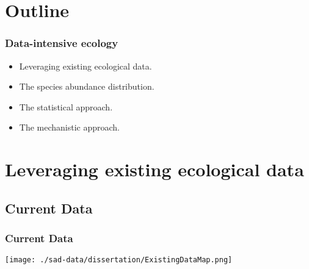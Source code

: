 \documentclass[14pt]{beamer}
\begin{document}
\section{Outline}
\begin{frame}
\frametitle{Data-intensive ecology}
\begin{itemize}
\item Leveraging existing ecological data.
\item The species abundance distribution.
\item The statistical approach.
\item The mechanistic approach.
\end{itemize}
\end{frame}


\section{Leveraging existing ecological data}
\subsection{Current Data}
\begin{frame}[t]
\frametitle{Current Data}
\vspace{-7pt}
\begin{center}
\texttt{[image: ./sad-data/dissertation/ExistingDataMap.png]}
\end{center}
\end{frame}
\end{document}
